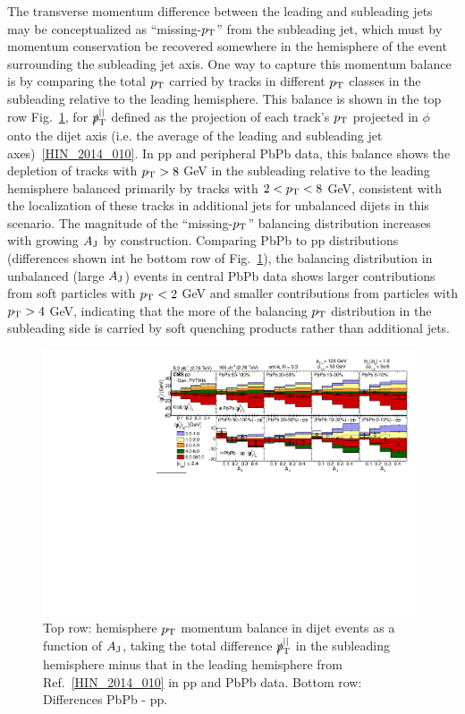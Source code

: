 The transverse momentum difference between the leading and subleading jets may be conceptualized as ``missing-$p_{\rm T}$'' from the subleading jet, which must by momentum conservation be recovered somewhere in the hemisphere of the event surrounding the subleading jet axis.  One way to capture this momentum balance is by comparing the total $p_{\rm T}$ carried by tracks in different $p_{\rm T}$ classes in the subleading relative to the leading hemisphere.  This balance is shown in the top row Fig.~\ref{fig:cms_mpT}, for $\slashed{p}_{\rm T}^{\rm ||}$ defined as the projection of each track's $p_{\rm T}$ projected in $\phi$ onto the dijet axis (i.e. the average of the leading and subleading jet axes)~\ref{HIN_2014_010}.  In pp and peripheral PbPb data, this balance shows the depletion of tracks with $p_{\rm T} > 8$ GeV in the subleading relative to the leading hemisphere balanced primarily by tracks with $2 < p_{\rm T} < 8$ GeV, consistent with the localization of these tracks in additional jets for unbalanced dijets in this scenario.  The magnitude of the ``missing-$p_{\rm T}$'' balancing distribution increases with growing $A_{\rm J}$ by construction.  Comparing PbPb to pp distributions (differences shown int he bottom row of Fig.~\ref{fig:cms_mpT}), the balancing distribution in unbalanced (large $A_{\rm J}$) events in central PbPb data shows larger contributions from soft particles with $p_{\rm T} < 2$ GeV and smaller contributions from particles with $p_{\rm T} > 4$ GeV, indicating that the more of the balancing $p_{\rm T}$ distribution in the subleading side is carried by soft quenching products rather than additional jets. 


\begin{figure}[hbtp]
\begin{center}
\includegraphics[width=0.99\textwidth]{figures/Theory/CMS_mpT.pdf}
\caption[Hemisphere $p_{\rm T}$ momentum balance in dijet events as a function of $A_{\rm J}$]{Top row: hemisphere $p_{\rm T}$ momentum balance in dijet events as a function of $A_{\rm J}$, taking the total difference $\slashed{p}_{\rm T}^{\rm ||}$ in the subleading hemisphere minus that in the leading hemisphere from Ref.~\ref{HIN_2014_010} in pp and PbPb data.  Bottom row:  Differences PbPb - pp.}
\label{fig:cms_mpT}
\end{center}
\end{figure}


